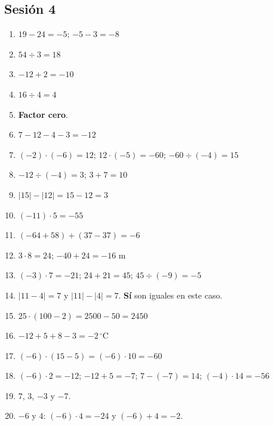 \documentclass[12pt, letterpaper]{article}
\begin{document}
\subsection*{Sesión 4}
\begin{enumerate}[leftmargin=*, label=\textbf{\arabic*.}]
  \item $19 - 24 = -5$; $-5 - 3 = -8$
  \item $54 \div 3 = 18$
  \item $-12 + 2 = -10$
  \item $16 \div 4 = 4$
  \item \textbf{Factor cero}.
  \item $7 - 12 - 4 - 3 = -12$
  \item $(-2) \cdot (-6) = 12$; $12 \cdot (-5) = -60$; $-60 \div (-4) = 15$
  \item $-12 \div (-4) = 3$; $3 + 7 = 10$
  \item $|15| - |12| = 15 - 12 = 3$
  \item $(-11) \cdot 5 = -55$
  \item $(-64 + 58) + (37 - 37) = -6$
  \item $3 \cdot 8 = 24$; $-40 + 24 = -16$ m
  \item $(-3) \cdot 7 = -21$; $24 + 21 = 45$; $45 \div (-9) = -5$
  \item $|11 - 4| = 7$ y $|11| - |4| = 7$. \textbf{Sí} son iguales en este caso.
  \item $25 \cdot (100 - 2) = 2500 - 50 = 2450$
  \item $-12 + 5 + 8 - 3 = -2\,^{\circ}$C
  \item $(-6) \cdot (15 - 5) = (-6) \cdot 10 = -60$
  \item $(-6) \cdot 2 = -12$; $-12 + 5 = -7$; $7 - (-7) = 14$; $(-4) \cdot 14 = -56$
  \item $7$, $3$, $-3$ y $-7$.
  \item $-6$ y $4$: $(-6) \cdot 4 = -24$ y $(-6) + 4 = -2$.
\end{enumerate}
\end{document}
